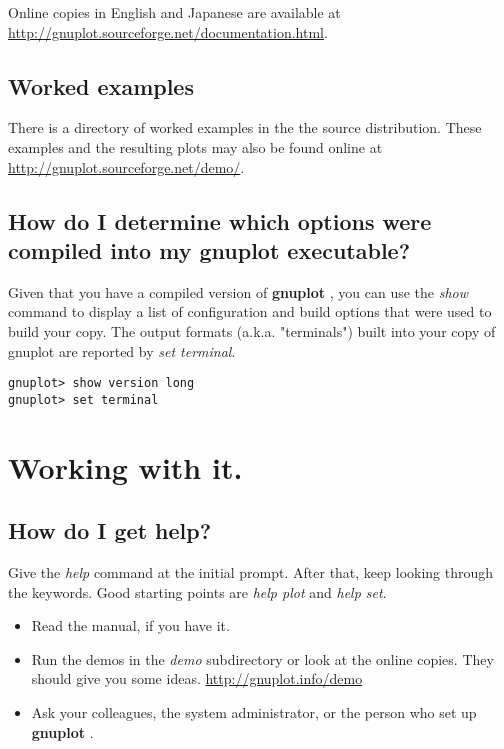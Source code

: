 \documentclass[letter,11pt]{article}
\def\http#1{{\small\href{http://#1}{\url{http://#1}}}}
\newcommand{\http}[1]%
            {\htmladdnormallink{\latex{\url{http://#1}}%
                    \html{\textit{http://#1}}}%
                {http://#1}%
            }
\newcommand{\gnuplot}{\textbf{gnuplot }}
\begin{document}
{Online copies in English and Japanese are available at
\http{gnuplot.sourceforge.net/documentation.html}.

\subsection{Worked examples}

There is a directory of worked examples in the the source distribution.
These examples and the resulting plots may also be found online at
\http{gnuplot.sourceforge.net/demo/}.


\subsection{How do I determine which options were compiled into my \gnuplot executable?}

Given that you have a compiled version of \gnuplot, you can use the
{\em show} command to display a list of configuration and build options
that were used to build your copy.  The output formats (a.k.a. "terminals")
built into your copy of gnuplot are reported by {\em set terminal}.

\small
\begin{verbatim}
gnuplot> show version long
gnuplot> set terminal
\end{verbatim}
\normalsize


\section{Working with it.}

\subsection{How do I get help?}

Give the {\em help} command at the initial prompt. After that, keep
looking through the keywords. Good starting points are {\em help plot}
and {\em help set}.

\begin{itemize}
\item
Read the manual, if you have it.

\item
Run the demos in the {\em demo} subdirectory or look at the
online copies. They should give you some ideas.
\http{gnuplot.info/demo}

\item
Ask your colleagues, the system administrator, or the person who
set up \gnuplot.


\end{itemize}}
\end{document}
